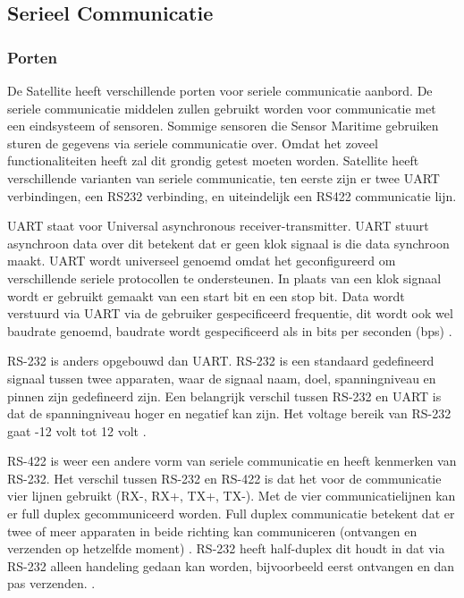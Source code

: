 \subsection{Serieel Communicatie}
\subsubsection{Porten}
De Satellite heeft verschillende porten voor seriele communicatie aanbord. De seriele communicatie middelen zullen gebruikt worden voor communicatie met een eindsysteem of sensoren. Sommige sensoren die Sensor Maritime gebruiken sturen de gegevens via seriele communicatie over. Omdat het zoveel functionaliteiten heeft zal dit grondig getest moeten worden. Satellite heeft verschillende varianten van seriele communicatie, ten eerste zijn er twee UART verbindingen, een RS232 verbinding, en uiteindelijk een RS422 communicatie lijn. \newline

\noindent UART staat voor Universal asynchronous receiver-transmitter. UART stuurt asynchroon data over dit betekent dat er geen klok signaal is die data synchroon maakt. UART wordt universeel genoemd omdat het geconfigureerd om verschillende seriele protocollen te ondersteunen. In plaats van een klok signaal wordt er gebruikt gemaakt van een start bit en een stop bit. Data wordt verstuurd via UART via de gebruiker gespecificeerd frequentie, dit wordt ook wel baudrate genoemd, baudrate wordt gespecificeerd als in bits per seconden (bps) \autocite{UART}. \newline

\noindent RS-232 is anders opgebouwd dan UART. RS-232 is een standaard gedefineerd signaal tussen twee apparaten, waar de signaal naam, doel, spanningniveau en pinnen zijn gedefineerd zijn. Een belangrijk verschil tussen RS-232 en UART is dat de spanningniveau hoger en negatief kan zijn. Het voltage bereik van RS-232 gaat -12 volt tot 12 volt \autocite{RS232}. \newline

\noindent RS-422 is weer een andere vorm van seriele communicatie en heeft kenmerken van RS-232. Het verschil tussen RS-232 en RS-422 is dat het voor de communicatie vier lijnen gebruikt (RX-, RX+, TX+, TX-). Met de vier communicatielijnen kan er full duplex gecommuniceerd worden. Full duplex communicatie betekent dat er twee of meer apparaten in beide richting kan communiceren (ontvangen en verzenden op hetzelfde moment) \autocite{FullDuplex}. RS-232 heeft half-duplex dit houdt in dat via RS-232 alleen handeling gedaan kan worden, bijvoorbeeld eerst ontvangen en dan pas verzenden. \autocite{RS422}. \newpage

